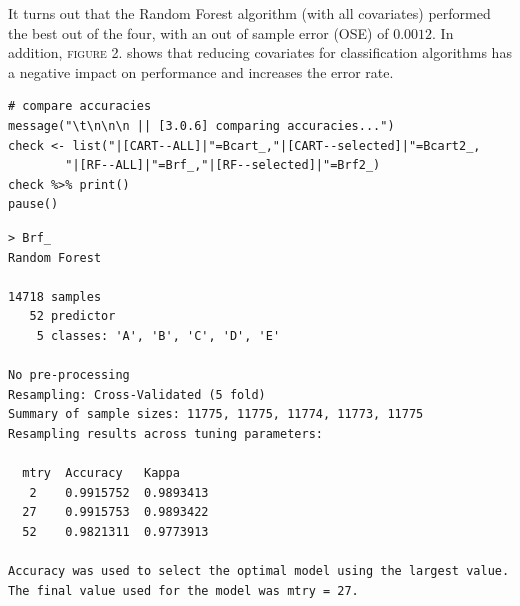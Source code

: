 \documentclass[10pt, twoside]{article}
\begin{document}
\noindent
It turns out that the Random Forest algorithm (with all covariates) performed the best out
of the four, with an out of sample error (OSE) of $0.0012$. In addition, \textsc{figure 2.}
shows that reducing covariates for classification algorithms has a negative impact on
performance and increases the error rate.
\bigskip

\begin{verbatim}
# compare accuracies
message("\t\n\n\n || [3.0.6] comparing accuracies...")
check <- list("|[CART--ALL]|"=Bcart_,"|[CART--selected]|"=Bcart2_,
        "|[RF--ALL]|"=Brf_,"|[RF--selected]|"=Brf2_)
check %>% print()
pause()
\end{verbatim}

\begin{verbatim}
> Brf_
Random Forest

14718 samples
   52 predictor
    5 classes: 'A', 'B', 'C', 'D', 'E'

No pre-processing
Resampling: Cross-Validated (5 fold)
Summary of sample sizes: 11775, 11775, 11774, 11773, 11775
Resampling results across tuning parameters:

  mtry  Accuracy   Kappa
   2    0.9915752  0.9893413
  27    0.9915753  0.9893422
  52    0.9821311  0.9773913

Accuracy was used to select the optimal model using the largest value.
The final value used for the model was mtry = 27.
\end{verbatim}
\end{document}
